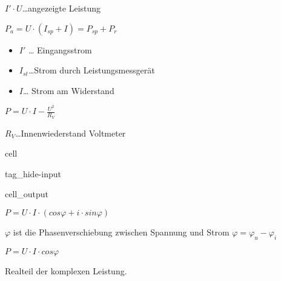 \documentclass[letterpaper,10pt,english]{jupyterBook}
\begin{document}
\sphinxAtStartPar
\(I'\cdot U\)…angezeigte Leistung

\sphinxAtStartPar
\(P_a = U\cdot(I_{sp} + I) = P_{sp} + P_r\)
\begin{itemize}
\item {} 
\sphinxAtStartPar
\(I'\) … Eingangsstrom

\item {} 
\sphinxAtStartPar
\(I_{st}\)…Strom durch Leistungsmessgerät

\item {} 
\sphinxAtStartPar
\(I\)… Strom am Widerstand

\end{itemize}

\sphinxAtStartPar
\(P = U\cdot I - \frac{U^2}{R_V}\)

\sphinxAtStartPar
\(R_V\)…Innenwiederstand Voltmeter

\begin{sphinxuseclass}{cell}
\begin{sphinxuseclass}{tag_hide-input}\begin{sphinxVerbatimOutput}

\begin{sphinxuseclass}{cell_output}
\noindent{}

\end{sphinxuseclass}\end{sphinxVerbatimOutput}

\end{sphinxuseclass}
\end{sphinxuseclass}
\begin{DUlineblock}{0em}
\item[] 
\end{DUlineblock}

\sphinxAtStartPar
\(P = U\cdot I\cdot (cos\varphi + i\cdot sin\varphi)\)

\sphinxAtStartPar
\(\varphi\) ist die Phasenverschiebung zwischen Spannung und Strom
\(\varphi = \varphi_u - \varphi_i\)

\begin{DUlineblock}{0em}
\item[] 
\end{DUlineblock}

\sphinxAtStartPar
\(P = U\cdot I \cdot cos \varphi\)

\sphinxAtStartPar
Realteil der komplexen Leistung.
\end{document}
